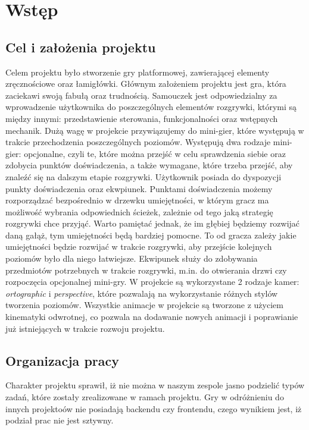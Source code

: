 \documentclass[oneside,polski,logo]{amuthesis}
\begin{document}

\chapter{Wstęp}
\section{Cel i założenia projektu}
Celem projektu było stworzenie gry platformowej, zawierającej elementy zręcznościowe oraz łamigłówki. Głównym założeniem projektu jest gra, która zaciekawi swoją fabułą oraz trudnością. Samouczek jest odpowiedzialny za wprowadzenie użytkownika do poszczególnych elementów rozgrywki, którymi są między innymi: przedstawienie sterowania, funkcjonalności oraz wstępnych mechanik. Dużą wagę w projekcie przywiązujemy do mini-gier, które występują w trakcie przechodzenia poszczególnych poziomów. Występują dwa rodzaje mini-gier: opcjonalne, czyli te, które można przejść w celu sprawdzenia siebie oraz zdobycia punktów doświadczenia, a także wymagane, które trzeba przejść, aby znaleźć się na dalszym etapie rozgrywki. Użytkownik posiada do dyspozycji punkty doświadczenia oraz ekwpiunek. Punktami doświadczenia możemy rozporządzać bezpośrednio w drzewku umiejętności, w którym gracz ma możliwość wybrania odpowiednich ścieżek, zależnie od tego jaką strategię rozgrywki chce przyjąć. Warto pamiętać jednak, że im głębiej będziemy rozwijać daną gałąż, tym umiejętności będą bardziej pomocne. To od gracza zależy jakie umiejętności będzie rozwijać w trakcie rozgrywki, aby przejście kolejnych poziomów było dla niego łatwiejsze. Ekwipunek służy do zdobywania przedmiotów potrzebnych w trakcie rozgrywki, m.in. do otwierania drzwi czy rozpoczęcia opcjonalnej mini-gry. W projekcie są wykorzystane 2 rodzaje kamer: \emph{ortographic} i \emph{perspective}, które pozwalają na wykorzystanie różnych stylów tworzenia poziomów. Wszystkie animacje w projekcie są tworzone z użyciem kinematyki odwrotnej, co pozwala na dodawanie nowych animacji i poprawianie już istniejących w trakcie rozwoju projektu.
\section{Organizacja pracy}
Charakter projektu sprawił, iż nie można w naszym zespole jasno podzielić typów zadań, które zostały zrealizowane w ramach projektu. Gry w odróżnieniu do innych projektoów nie posiadają backendu czy frontendu, czego wynikiem jest, iż podział prac nie jest sztywny. 
\end{document}
